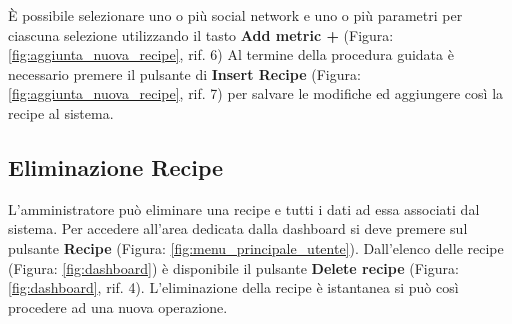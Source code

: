 		È possibile selezionare uno o più social network e uno o più parametri per ciascuna selezione utilizzando il tasto \textbf{Add metric +} (Figura: \ref{fig:aggiunta_nuova_recipe}, rif. 6)\newline
		Al termine della procedura guidata è necessario premere il pulsante di \textbf{Insert Recipe} (Figura: \ref{fig:aggiunta_nuova_recipe}, rif. 7) per salvare le modifiche ed aggiungere così la recipe\gloss{} al sistema.


	\subsection{Eliminazione Recipe}
		L'amministratore può eliminare una recipe\gloss{} e tutti i dati ad essa associati dal sistema.\newline
		Per accedere all'area dedicata dalla dashboard\gloss{} si deve premere sul pulsante \textbf{Recipe}\gloss{} (Figura: \ref{fig:menu_principale_utente}). Dall'elenco delle recipe\gloss{} (Figura: \ref{fig:dashboard}) è disponibile il pulsante \textbf{Delete recipe} (Figura: \ref{fig:dashboard}, rif. 4).
		L'eliminazione della recipe è istantanea si può così procedere ad una nuova operazione.

	
